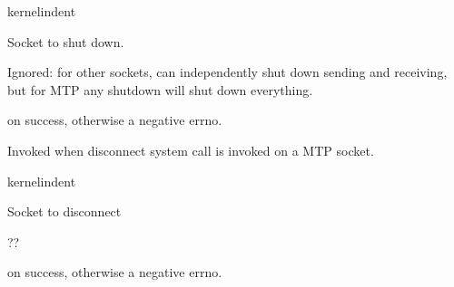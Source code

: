 \documentclass[letterpaper,10pt,english]{sphinxmanual}
\begin{document}
\begin{sphinxuseclass}{kernelindent}
\sphinxAtStartPar
{}
\begin{description}
\sphinxAtStartPar
Socket to shut down.

\sphinxAtStartPar
Ignored: for other sockets, can independently shut down
sending and receiving, but for MTP any shutdown will
shut down everything.

\end{description}

\sphinxAtStartPar
{}

 on success, otherwise a negative errno.

\end{sphinxuseclass}

\begin{fulllineitems}
\label{\detokenize{mtpimpl.c:c.MTP_disconnect}}
\pysigstartsignatures
\pysigstartmultiline
{}
\pysigstopmultiline
\pysigstopsignatures
\sphinxAtStartPar
Invoked when disconnect system call is invoked on a MTP socket.

\end{fulllineitems}


\begin{sphinxuseclass}{kernelindent}
\sphinxAtStartPar
{}
\begin{description}
\sphinxAtStartPar
Socket to disconnect

\sphinxAtStartPar
??

\end{description}

\sphinxAtStartPar
{}

 on success, otherwise a negative errno.

\end{sphinxuseclass}
\end{document}
